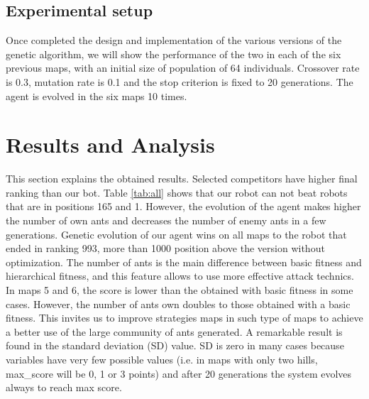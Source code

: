 \documentclass[runningheads]{llncs}
\begin{document}
\subsection{Experimental setup}

Once completed the design and implementation of the various versions of the genetic algorithm, we will show the performance  of the two in each of the six previous maps, with an initial size of population of 64 individuals. Crossover rate is 0.3, mutation rate is 0.1 and the stop criterion is fixed to 20 generations. The agent is evolved in the six maps 10 times.

\section{Results and Analysis}
\label{sec:results}


This section explains the obtained results. Selected competitors have higher final ranking than our bot. Table \ref{tab:all} shows that our robot can not beat robots that are in positions 165 and 1. However, the evolution of the agent makes higher the number of own ants and decreases the number of enemy ants in a few generations. Genetic evolution of our agent wins on all maps to the robot that ended in ranking 993, more than 1000 position above the version without optimization. The number of ants is the main difference between basic fitness and hierarchical fitness, and this feature allows to use more effective attack technics. In maps 5 and 6, the score is lower than the obtained with basic fitness in some cases. However, the number of ants own doubles to those obtained with a basic fitness. This invites us to improve strategies maps in such type of maps to achieve a better use of the large community of ants generated. A remarkable result is found in the standard deviation (SD) value. SD is zero in many cases because variables have very few possible values (i.e. in maps with only two hills, max\_score will be 0, 1 or 3 points) and after 20 generations the system evolves always to reach max score. 
%
%
%
%


\end{document}
